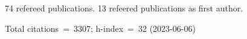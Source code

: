 74 refereed publications. 13 refeered publications as first author.

Total citations~=~3307; h-index~=~32 (2023-06-06)